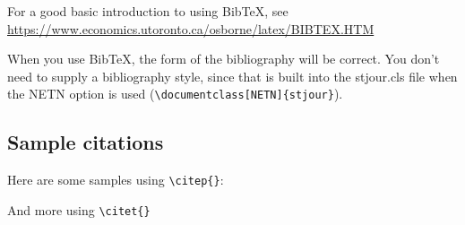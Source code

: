 \documentclass[NETN]{stjour}
\begin{document}
For a good basic introduction to using BibTeX, see\\
\href{https://www.economics.utoronto.ca/osborne/latex/BIBTEX.HTM}
{https://www.economics.utoronto.ca/osborne/latex/BIBTEX.HTM}

When you use BibTeX, the form of the bibliography will be correct. You
don't need to supply a bibliography style, since that is built into
the stjour.cls file when the NETN option is used
(\verb+\documentclass[NETN]{stjour}+).



\newpage
\subsection{Sample citations}

Here are some samples using \verb+\citep{}+:\\
\citep{bullmore2009complex,
gomez2009analysis,
rubinov2011weight,
power2014methods,
sporns2015modular,
scheeringa2012eeg,
fortunato2007resolution,
reichardt2006statistical,
smith2009correspondence,
sporns2011networks,
liegeois2014cerebral}

And more using \verb+\citet{}+\\
\citet{allen2012tracking,
calhoun2014chronnectome,
liu2013time,
fisher1915frequency,
gonzalez2014spatial,
damaraju2014dynamic,
hutchison2013resting,
de2012cortical,
tagliazucchi2012dynamic,
nooner2012nki}

\newpage




\end{document}
